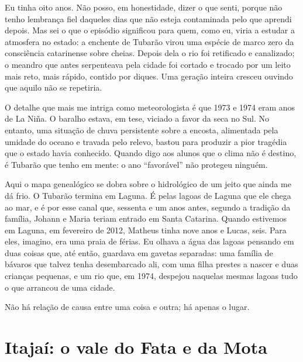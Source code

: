 \documentclass[
  brazilian,
  11pt,
  openany]{book}
\begin{document}
Eu tinha oito anos. Não posso, em honestidade, dizer o que senti, porque
não tenho lembrança fiel daqueles dias que não esteja contaminada pelo
que aprendi depois. Mas sei o que o episódio significou para quem, como
eu, viria a estudar a atmosfera no estado: a enchente de Tubarão virou
uma espécie de marco zero da consciência catarinense sobre cheias.
Depois dela o rio foi retificado e canalizado; o meandro que antes
serpenteava pela cidade foi cortado e trocado por um leito mais reto,
mais rápido, contido por diques. Uma geração inteira cresceu ouvindo que
aquilo não se repetiria.

O detalhe que mais me intriga como meteorologista é que 1973 e 1974 eram
anos de La Niña. O baralho estava, em tese, viciado a favor da seca no
Sul. No entanto, uma situação de chuva persistente sobre a encosta,
alimentada pela umidade do oceano e travada pelo relevo, bastou para
produzir a pior tragédia que o estado havia conhecido. Quando digo aos
alunos que o clima não é destino, é Tubarão que tenho em mente: o ano
``favorável'' não protegeu ninguém.

Aqui o mapa genealógico se dobra sobre o hidrológico de um jeito que
ainda me dá frio. O Tubarão termina em Laguna. É pelas lagoas de Laguna
que ele chega ao mar, e é por esse canal que, sessenta e um anos antes,
segundo a tradição da família, Johann e Maria teriam entrado em Santa
Catarina. Quando estivemos em Laguna, em fevereiro de 2012, Matheus
tinha nove anos e Lucas, seis. Para eles, imagino, era uma praia de
férias. Eu olhava a água das lagoas pensando em duas coisas que, até
então, guardava em gavetas separadas: uma família de bávaros que talvez
tenha desembarcado ali, com uma filha prestes a nascer e duas crianças
pequenas, e um rio que, em 1974, despejou naquelas mesmas lagoas tudo o
que arrancou de uma cidade.

Não há relação de causa entre uma coisa e outra; há apenas o lugar.

\section{Itajaí: o vale do Fata e da
Mota}\label{itajauxed-o-vale-do-fata-e-da-mota}
\end{document}
